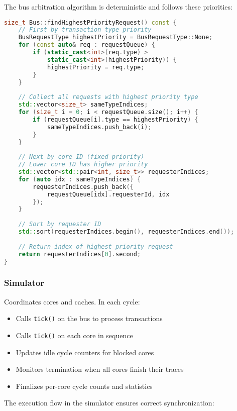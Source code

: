 \documentclass[11pt]{article}
\begin{document}
The bus arbitration algorithm is deterministic and follows these priorities:

\begin{lstlisting}[language=C++, caption=Bus Arbitration Algorithm]
size_t Bus::findHighestPriorityRequest() const {
    // First by transaction type priority
    BusRequestType highestPriority = BusRequestType::None;
    for (const auto& req : requestQueue) {
        if (static_cast<int>(req.type) > 
            static_cast<int>(highestPriority)) {
            highestPriority = req.type;
        }
    }
    
    // Collect all requests with highest priority type
    std::vector<size_t> sameTypeIndices;
    for (size_t i = 0; i < requestQueue.size(); i++) {
        if (requestQueue[i].type == highestPriority) {
            sameTypeIndices.push_back(i);
        }
    }
    
    // Next by core ID (fixed priority)
    // Lower core ID has higher priority
    std::vector<std::pair<int, size_t>> requesterIndices;
    for (auto idx : sameTypeIndices) {
        requesterIndices.push_back({
            requestQueue[idx].requesterId, idx
        });
    }
    
    // Sort by requester ID
    std::sort(requesterIndices.begin(), requesterIndices.end());
    
    // Return index of highest priority request
    return requesterIndices[0].second;
}
\end{lstlisting}

\subsubsection{Simulator}
Coordinates cores and caches. In each cycle:
\begin{itemize}
    \item Calls \texttt{tick()} on the bus to process transactions
    \item Calls \texttt{tick()} on each core in sequence
    \item Updates idle cycle counters for blocked cores
    \item Monitors termination when all cores finish their traces
    \item Finalizes per-core cycle counts and statistics
\end{itemize}

The execution flow in the simulator ensures correct synchronization:
\end{document}
